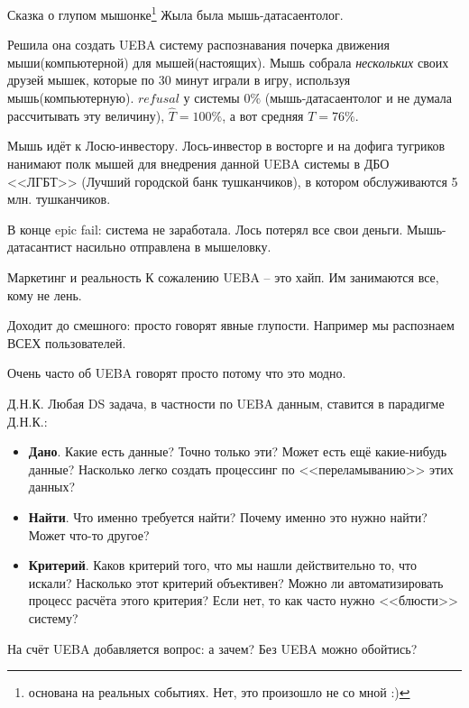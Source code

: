 \begin{frame}{Сказка о глупом мышонке\footnote{основана на реальных событиях. Нет, это произошло не со мной :)}}
	\footnotesize
	Жыла была мышь-датасаентолог. 
	
	Решила она создать UEBA систему распознавания почерка движения мыши(компьютерной) 
	для мышей(настоящих).  	
	Мышь собрала \textit{нескольких} своих друзей мышек, 
	которые по 30 минут играли в игру, используя мышь(компьютерную).
	$refusal$ у системы $0\%$ (мышь-датасаентолог и не думала рассчитывать эту величину),
	$\hat T = 100\%$, а вот средняя $T = 76\%$.
	
	Мышь идёт к Лосю-инвестору. Лось-инвестор в восторге
	и на дофига тугриков нанимают полк мышей для внедрения 
	данной UEBA системы
	в ДБО <<ЛГБТ>> (Лучший городской банк тушканчиков),
	в котором обслуживаются 5 млн. тушканчиков.
	
	В конце epic fail: система не заработала. 
	Лось потерял все свои деньги. Мышь-датасантист насильно отправлена в мышеловку.
	
\end{frame}

\begin{frame}{Маркетинг и реальность}
	К сожалению UEBA -- это хайп. 
	Им занимаются все, кому не лень. 
	
	Доходит до смешного: просто говорят явные глупости.
	Например мы распознаем ВСЕХ пользователей.
	
	Очень часто об UEBA говорят просто потому что это модно.
	
\end{frame}

\begin{frame}{Д.Н.К.}
	Любая DS задача, в частности по UEBA данным, ставится в парадигме Д.Н.К.:
	\begin{itemize}
		\item \textbf{Дано}. Какие есть данные?
		Точно только эти? Может есть ещё какие-нибудь данные?
		Насколько легко создать процессинг по <<переламыванию>>
		этих данных?
		\item \textbf{Найти}. Что именно требуется найти?
		Почему именно это нужно найти? Может что-то другое?
		\item \textbf{Критерий}. Каков критерий того, что мы нашли действительно
		то, что искали? Насколько этот критерий объективен? Можно ли автоматизировать
		процесс расчёта этого критерия? Если нет, то как часто нужно <<блюсти>>
		систему?
	\end{itemize}
	На счёт UEBA добавляется вопрос: а зачем? Без UEBA можно обойтись?
\end{frame}

